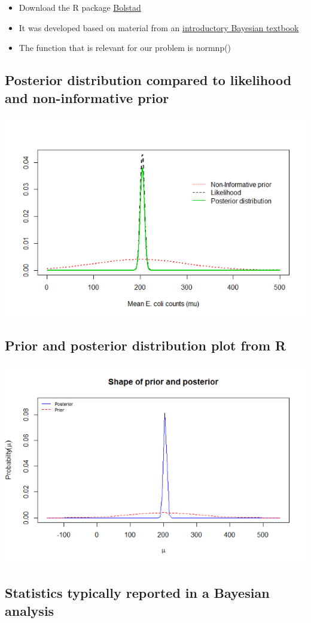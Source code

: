\documentclass[
]{book}
\providecommand{\tightlist}{%
  \setlength{\itemsep}{0pt}\setlength{\parskip}{0pt}}
\begin{document}
\begin{itemize}
\tightlist
\item
  Download the R package \href{https://cran.r-project.org/web/packages/Bolstad/index.html}{Bolstad}
\item
  It was developed based on material from an \href{https://mcgill.worldcat.org/title/introduction-to-bayesian-statistics/oclc/957525550\&referer=brief_results}{introductory Bayesian textbook}
\item
  The function that is relevant for our problem is normnp()
\end{itemize}

\hypertarget{posterior-distribution-compared-to-likelihood-and-non-informative-prior}{%
\subsection{Posterior distribution compared to likelihood and non-informative prior}\label{posterior-distribution-compared-to-likelihood-and-non-informative-prior}}

\includegraphics[width=0.5\linewidth]{./6_24}

\hypertarget{prior-and-posterior-distribution-plot-from-r}{%
\subsection{Prior and posterior distribution plot from R}\label{prior-and-posterior-distribution-plot-from-r}}

\includegraphics[width=0.5\linewidth]{./6_25}

\hypertarget{statistics-typically-reported-in-a-bayesian-analysis}{%
\subsection{Statistics typically reported in a Bayesian analysis}\label{statistics-typically-reported-in-a-bayesian-analysis}}
\end{document}
